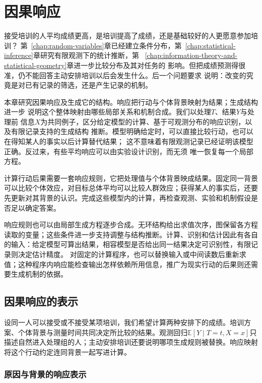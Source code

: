 \chapter{因果响应}
\label{chap:causal-inference}

接受培训的人平均成绩更高，是培训提高了成绩，还是基础较好的人更愿意参加培训？
第~\ref{chap:random-variables}章已经建立条件分布，第~\ref{chap:statistical-inference}章研究有限观测下的统计推断，第
~\ref{chap:information-theory-and-statistical-geometry}章进一步比较分布及其对任务的
影响。但把成绩预测得很准，仍不能回答主动安排培训以后会发生什么。后一个问题要求
说明：改变的究竟是对已有记录的筛选，还是产生记录的机制。

本章研究因果响应及生成它的结构。响应把行动与个体背景映射为结果；生成结构进一步
说明这个整体映射由哪些局部关系和机制合成。我们以处理\(T\)、结果\(Y\)与处理前
信息\(X\)为共同例子，区分给定模型的计算、基于可观测分布的响应识别，以及有限记录支持的生成结构
推断。模型明确给定时，可以直接比较行动，也可以在得知某人的事实以后计算替代结果；
这不意味着有限观测记录已经证明该模型正确。反过来，有些平均响应可以由实验设计识别，而无须
唯一恢复每一个局部方程。

计算行动后果需要一套响应规则，它把处理值与个体背景映成结果。固定同一背景可以比较个体效应，对目标总体平均可以比较人群效应；获得某人的事实后，还要先更新对其背景的认识。完成这些模型内的计算，再检查观测、实验和机制假设是否足以确定答案。

响应规则也可以由局部生成方程逐步合成。无环结构给出求值次序，图保留各方程读取的变量；这些条件进一步支持调整与结构推断。计算、识别和估计因此有各自的输入：给定模型可算出结果，相容模型是否给出同一结果决定可识别性，有限记录则决定估计精度。
对固定的计算程序，也可以替换输入或中间读数后重新求值；这种程序内响应能检查输出怎样依赖所用信息，推广为现实行动的后果则还需要生成机制的依据。

\section{因果响应的表示}
\label{sec:causal-response-representation}

设同一人可以接受或不接受某项培训，我们希望计算两种安排下的成绩。培训方案、个体背景与测量时间共同决定所比较的结果。观测回归\(\mathbb E[Y\mid T=t,X=x]\)只描述自然进入处理组的人；主动安排培训还要说明哪项生成规则被替换。响应映射将这个行动约定连同背景一起写进计算。

\subsection{原因与背景的响应表示}
\label{sec:causal-observation-generation}

